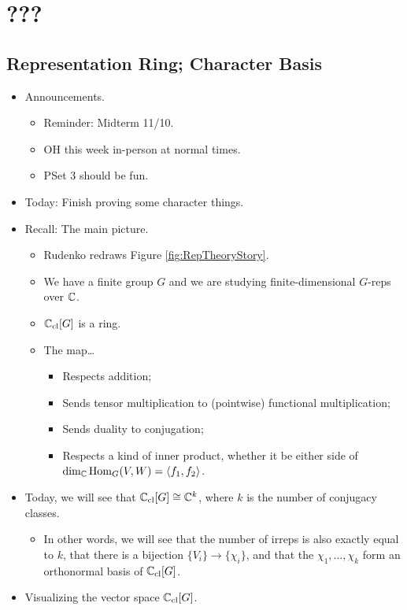 \documentclass[../notes.tex]{subfiles}
\begin{document}
\chapter{???}
\section{Representation Ring; Character Basis}
\begin{itemize}
    \item {}Announcements.
    \begin{itemize}
        \item Reminder: Midterm 11/10.
        \item OH this week in-person at normal times.
        \item PSet 3 should be fun.
    \end{itemize}
    \item Today: Finish proving some character things.
    \item Recall: The main picture.
    \begin{itemize}
        \item Rudenko redraws Figure \ref{fig:RepTheoryStory}.
        \item We have a finite group $G$ and we are studying finite-dimensional $G$-reps over $\mathbb{C}$.
        \item $\mathbb{C}_\text{cl}[G]$ is a ring.
        \item The map\dots
        \begin{itemize}
            \item Respects addition;
            \item Sends tensor multiplication to (pointwise) functional multiplication;
            \item Sends duality to conjugation;
            \item Respects a kind of inner product, whether it be either side of $\dim_{\mathbb{C}}\operatorname{Hom}_G(V,W)=\left\langle{f_1,f_2}\right\rangle$.
        \end{itemize}
    \end{itemize}
    \item Today, we will see that $\mathbb{C}_\text{cl}[G]\cong\mathbb{C}^k$, where $k$ is the number of conjugacy classes.
    \begin{itemize}
        \item In other words, we will see that the number of irreps is also exactly equal to $k$, that there is a bijection $\{V_i\}\to\{\chi_i\}$, and that the $\chi_1,\dots,\chi_k$ form an orthonormal basis of $\mathbb{C}_\text{cl}[G]$.
    \end{itemize}
    \item Visualizing the vector space $\mathbb{C}_\text{cl}[G]$.
    \begin{figure}[h!]
        \centering
\end{figure}
\end{itemize}
\end{document}
